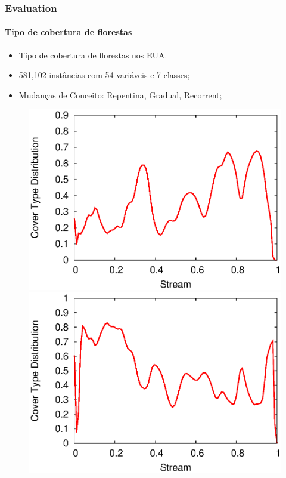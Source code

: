\documentclass[14pt]{beamer}
\begin{document}
\begin{frame}
\frametitle{Evaluation}
\framesubtitle{Tipo de cobertura de florestas}
\begin{itemize}
    \item Tipo de cobertura de florestas nos EUA.
    \item 581,102 instâncias com 54 variáveis e 7 classes;
    \item Mudanças de Conceito: Repentina, Gradual, Recorrent;
\end{itemize}
\begin{figure}[htp!]
\centering
\includegraphics[scale=0.3]{covtype_class_stream_1.eps}
\includegraphics[scale=0.3]{covtype_class_stream_2.eps}

\end{figure}
\end{frame}
\end{document}
